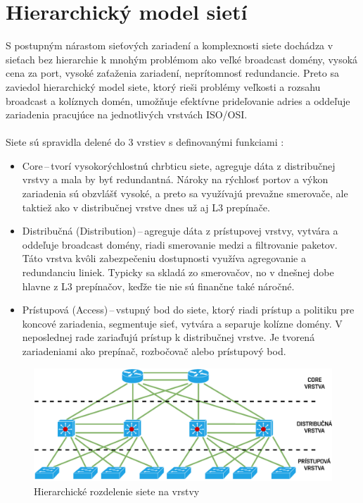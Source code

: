 \section{Hierarchický model sietí}
S postupným nárastom sieťových zariadení a komplexnosti siete dochádza v sieťach bez hierarchie k mnohým problémom ako veľké broadcast domény, vysoká cena za port, vysoké zaťaženia zariadení, neprítomnosť redundancie. Preto sa zaviedol hierarchický model siete, ktorý rieši problémy veľkosti a rozsahu broadcast a kolíznych domén, umožňuje efektívne prideľovanie  adries a oddeľuje zariadenia pracujúce na jednotlivých vrstvách ISO/OSI.  
\\\\
\noindent
Siete sú spravidla delené do 3 vrstiev s definovanými funkciami \cite{Lammle2013}:
\begin{itemize}
	\item Core\,--\,tvorí vysokorýchlostnú chrbticu siete, agreguje dáta z distribučnej vrstvy a mala by byť redundantná. Nároky na rýchlosť portov a výkon zariadenia sú obzvlášť vysoké, a preto sa využívajú prevažne smerovače, ale taktiež ako v distribučnej vrstve dnes už aj L3 prepínače.
	\item Distribučná (Distribution)\,--\,agreguje dáta z prístupovej vrstvy, vytvára a oddeľuje broadcast domény, riadi smerovanie medzi  a  filtrovanie paketov. Táto vrstva kvôli zabezpečeniu dostupnosti využíva agregovanie  a redundanciu liniek. Typicky sa skladá zo smerovačov, no v dnešnej dobe hlavne z L3 prepínačov, keďže tie nie sú finančne také náročné. 
	\item Prístupová (Access)\,--\,vstupný bod do siete, ktorý riadi prístup a politiku pre koncové zariadenia, segmentuje sieť, vytvára a separuje kolízne domény. V neposlednej rade zariaďujú prístup k distribučnej vrstve. Je tvorená zariadeniami ako prepínač, rozbočovač alebo prístupový bod.
\end{itemize} 
\vspace{2em}
\begin{figure}[H]
	\begin{center}
		\includegraphics[scale=0.9]{obrazky/hierarchy_network.pdf}
	\end{center}

	\caption[Hierarchické rozdelenie siete na vrstvy]{Hierarchické rozdelenie siete na vrstvy}
	\label{fig:net-hierarchy}
\end{figure} 

